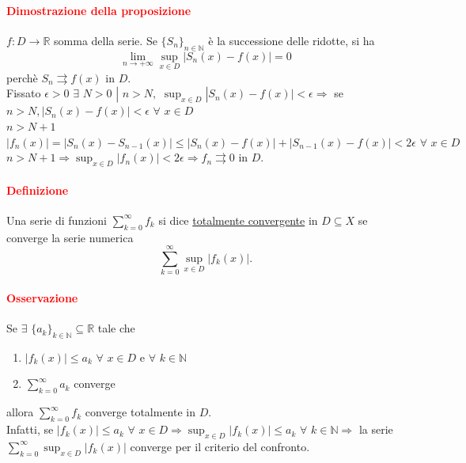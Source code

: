 \documentclass{article}
\newcommand{\R}{\mathbb{R}}
\newcommand{\N}{\mathbb{N}}
\begin{document}
\paragraph{\textcolor{red}{Dimostrazione della proposizione}}
$f:D \rightarrow \R$ somma della serie. Se $\{S_n\}_{n \in \N}$ è la successione delle ridotte, si ha 
\begin{equation*}
    \lim_{n \rightarrow + \infty} \sup_{x \in D} |S_n(x)-f(x)|=0
\end{equation*}
perchè $S_n \rightrightarrows f(x)$ in $D$.\\
Fissato $\epsilon >0 \,\, \exists\,\, N >0\,\, |\,\, n > N,\,\,\sup_{x \in D} |S_n(x)-f(x)|< \epsilon \Rightarrow$ se $n > N, |S_n(x)-f(x)|< \epsilon \,\, \forall \,\, x \in D$\\
$n > N +1$\\
$|f_n(x)|=|S_n(x)-S_{n-1}(x)|\leq |S_n (x)-f(x)|+|S_{n-1}(x)-f(x)| < 2 \epsilon \,\, \forall \,\, x \in D$\\
$n > N+1 \Rightarrow \sup_{x \in D}|f_n(x)| < 2 \epsilon \Rightarrow f_n \rightrightarrows 0$ in $D$.
\begin{flushright}
\large\Lightning
\end{flushright}

\paragraph{\textcolor{red}{Definizione}}
Una serie di funzioni $\sum_{k=0}^{\infty}f_k$ si dice \underline{totalmente convergente} in $D \subseteq X$ se converge la serie numerica 
\begin{equation*}
    \sum_{k=0}^{\infty}\sup_{x\in D}|f_k(x)|.
\end{equation*}

\paragraph{\textcolor{red}{Osservazione}}
Se $\exists\,\, \{a_k\}_{k \in \N}\subseteq \R$ tale che 
\begin{enumerate}
    \item $|f_k(x)|\leq a_k \,\, \forall \,\, x \in D$ e $\forall\,\, k \in \N $
    \item $\sum_{k=0}^{\infty}a_k$ converge 
\end{enumerate}
allora $\sum_{k=0}^{\infty}f_k$ converge totalmente in $D$.\\
Infatti, se $|f_k(x)|\leq a_k \,\,\forall \,\,x \in D \Rightarrow \sup_{x \in D} |f_k (x)|\leq a_k \,\,\forall\,\, k \in \N \Rightarrow$ la serie $\sum_{k=0}^{\infty} \sup_{x \in D}|f_k(x)|$ converge per il criterio del confronto.
\end{document}
